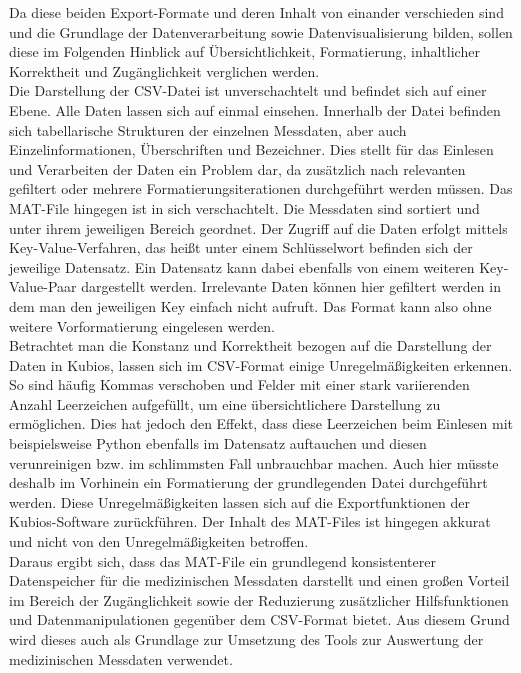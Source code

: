 Da diese beiden Export-Formate und deren Inhalt von einander verschieden sind und die Grundlage der Datenverarbeitung sowie Datenvisualisierung bilden, sollen diese im Folgenden Hinblick auf Übersichtlichkeit, Formatierung, inhaltlicher Korrektheit und Zugänglichkeit verglichen werden.\\
Die Darstellung der CSV-Datei ist unverschachtelt und befindet sich auf einer Ebene. Alle Daten lassen sich auf einmal einsehen. Innerhalb der Datei befinden sich tabellarische Strukturen der einzelnen Messdaten, aber auch Einzelinformationen, Überschriften und Bezeichner. Dies stellt für das Einlesen und Verarbeiten der Daten ein Problem dar, da zusätzlich nach relevanten gefiltert oder mehrere Formatierungsiterationen durchgeführt werden müssen. Das MAT-File hingegen ist in sich verschachtelt. Die Messdaten sind sortiert und unter ihrem jeweiligen Bereich geordnet. Der Zugriff auf die Daten erfolgt mittels Key-Value-Verfahren, das heißt unter einem Schlüsselwort befinden sich der jeweilige Datensatz. Ein Datensatz kann dabei ebenfalls von einem weiteren Key-Value-Paar dargestellt werden. Irrelevante Daten können hier gefiltert werden in dem man den jeweiligen Key einfach nicht aufruft. Das Format kann also ohne weitere Vorformatierung eingelesen werden.\\
Betrachtet man die Konstanz und Korrektheit bezogen auf die Darstellung der Daten in Kubios, lassen sich im CSV-Format einige Unregelmäßigkeiten erkennen. So sind häufig Kommas verschoben und Felder mit einer stark variierenden Anzahl Leerzeichen aufgefüllt, um eine übersichtlichere Darstellung zu ermöglichen. Dies hat jedoch den Effekt, dass diese Leerzeichen beim Einlesen mit beispielsweise Python ebenfalls im Datensatz auftauchen und diesen verunreinigen bzw. im schlimmsten Fall unbrauchbar machen. Auch hier müsste deshalb im Vorhinein ein Formatierung der grundlegenden Datei durchgeführt werden. \color{red}Diese Unregelmäßigkeiten lassen sich auf die Exportfunktionen der Kubios-Software zurückführen. \color{black}Der Inhalt des MAT-Files ist hingegen akkurat und nicht von den Unregelmäßigkeiten betroffen.\\
Daraus ergibt sich, dass das MAT-File ein grundlegend konsistenterer Datenspeicher für die medizinischen Messdaten darstellt und einen großen Vorteil im Bereich der Zugänglichkeit sowie der Reduzierung zusätzlicher Hilfsfunktionen und Datenmanipulationen gegenüber dem CSV-Format bietet. Aus diesem Grund wird dieses auch als Grundlage zur Umsetzung des Tools zur Auswertung der medizinischen Messdaten verwendet.


